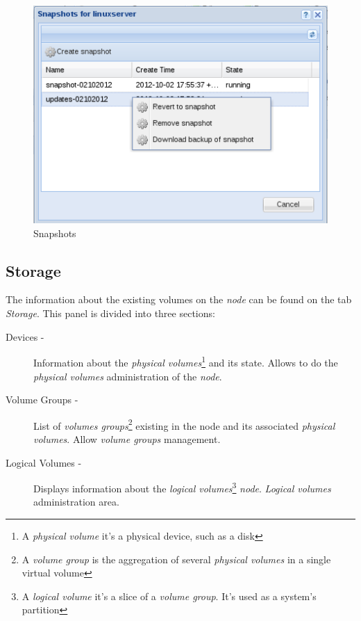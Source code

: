 \begin{figure}[H]
	\begin{center}
	\includegraphics[scale=0.5]{screenshots/server_snapshots.png}
	\caption{Snapshots}
	\label{fig:server_snapshots}
	\end{center}
\end{figure}

\subsection{Storage}
\label{sec:storage}

The information about the existing volumes on the \emph{node} can be found on the tab \emph{Storage}.
This panel is divided into three sections:

\begin{description}
	\item[Devices -] Information about the \emph{physical volumes}\footnote{A \emph{physical volume} it's a physical device, such as a disk} and its state. Allows to do the \emph{physical volumes} administration of the \emph{node}.
	\item[Volume Groups -] List of \emph{volumes groups}\footnote{A \emph{volume group} is the aggregation of several \emph{physical volumes} in a single virtual volume} existing in the node and its associated \emph{physical volumes}. Allow \emph{volume groups} management.
	\item[Logical Volumes -] Displays information about the \emph{logical volumes}\footnote{A \emph{logical volume} it's a slice of a \emph{volume group}. It's used as a system's partition} \emph{node}. \emph{Logical volumes} administration area.
\end{description}


